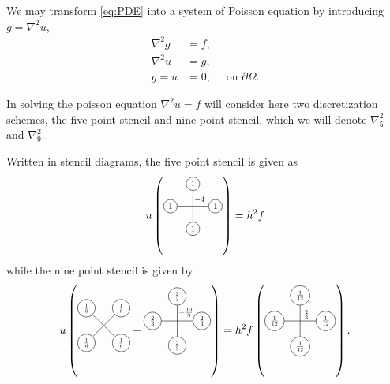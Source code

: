 
We may transform \eqref{eq:PDE} into a system of Poisson equation by introducing $g = \nabla^2 u$,
\begin{align}\label{eq:PDE-poisson}
  \nabla^2g &= f,\\
  \nabla^2u &= g,\\
  g = u &= 0,\quad \text{ on } \partial \Omega.
\end{align}


In solving the poisson equation $\nabla^2 u = f$ will consider here two discretization schemes, the five point stencil and nine point stencil, which we will denote $\nabla_5^2$ and $\nabla_9^2$.

\newcommand{\crossStencil}[5]{%
  \begin{tikzpicture}[scale=0.5,baseline=1mm, every node/.style={scale=0.7}, nodes={draw, circle}]
    \draw node[below]{$#1$} (0,0) -- (0,2) node[above]{$#2$};
    \draw (-1, 1) node[left]{$#3$} -- (1, 1) node[right]{$#4$};
    \node[above right, draw=none] at (0,1) {$#5$};
  \end{tikzpicture}
}

\newcommand{\xStencil}[4]{%
  \begin{tikzpicture}[scale=0.5,baseline=1mm, every node/.style={scale=0.7}, nodes={draw, circle}]
    \draw node[below left]{$#1$} (0,0) -- (1.41, 1.41) node[above right]{$#2$};
    \draw (0, 1.41) node[above left]{$#3$} -- (1.41, 0) node[below right]{$#4$};
  \end{tikzpicture}
}

Written in stencil diagrams, the five point stencil is given as 
$$
u \left(\crossStencil{1}{1}{1}{1}{-4}\right) = h^2 f
$$
while the nine point stencil is given by
$$
u
\left(
\xStencil{\frac16}{\frac16}{\frac16}{\frac16}
+
\crossStencil{\frac23}{\frac23}{\frac23}{\frac23}{-\frac{10}{3}}
\right)
=
h^2
f
\left(
\crossStencil{\frac1{12}}{\frac1{12}}{\frac1{12}}{\frac1{12}}{\frac23}
\right).
$$


